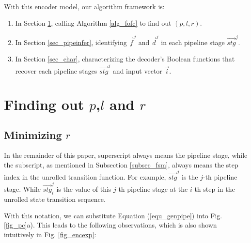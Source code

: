 \documentclass[conference]{IEEEtran}
\begin{document}




With this encoder model,
our algorithm framework is:

\begin{enumerate}
 \item In Section \ref{sec_plr}, 
 calling Algorithm \ref{alg_fofc} to find out $(p,l,r)$.
 \item In Section \ref{sec_pipeinfer}, 
 identifying $\vec{f}^j$ and $\vec{d}^j$ in each pipeline stage $\vec{stg}^j$. 
 \item In Section \ref{sec_char}, 
 characterizing the decoder's Boolean functions that recover each pipeline stages $\vec{stg}^j$
 and input vector $\vec{i}$.
\end{enumerate}

\section{Finding out $p$,$l$ and $r$}\label{sec_plr}
\subsection{Minimizing $r$}\label{reduceing}

In the remainder of this paper,
superscript always means the pipeline stage,
while the subscript,
as mentioned in Subsection \ref{subsec_fsm},
always means the step index in the unrolled transition function.
For example,
$\vec{stg}^j$ is the $j$-th pipeline stage.
While $\vec{stg}^j_i$ is the value of this $j$-th pipeline stage 
at the $i$-th step in the unrolled state transition sequence.

With this notation,
we can substitute Equation (\ref{equ_genpipe}) into Fig. \ref{fig_pc}a).
This leads to the following observations,
which is also shown intuitively in Fig. \ref{fig_encexp}:
\end{document}
